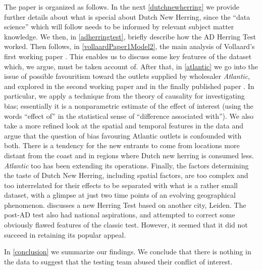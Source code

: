 \documentclass[alpha-refs]{wiley-article}
\newcommand{\fn}[1]{\textcolor{purple}{#1}}
\begin{document}
The paper is organized as follows. In the next \cref{dutchnewherring} we provide further details about what is special about Dutch New Herring, since the ``data science'' which will follow needs to be informed by relevant subject matter knowledge. We then, in \cref{adherringtest}, briefly describe how the AD Herring Test worked. Then follows, in \cref{vollaardPaper1Model2}, the main analysis of Vollaard's first working paper \citet{vollaard1}. This enables us to discuss some key features of the dataset which, we argue, must be taken account of. After that, in \cref{atlantic} we go into the issue of possible favouritism toward the outlets supplied by wholesaler \emph{Atlantic}, and explored in the second working paper \citet{vollaard2} and in the finally published paper  \citet{vollaard2021bias}. In particular, we apply a technique from the theory of causality for investigating bias; essentially it is a nonparametric estimate of the effect of interest (using the words ``effect of'' in the statistical sense of ``difference associated with''). 
We also take a more refined look at the spatial and temporal features in the data and argue that the question of bias favouring Atlantic outlets is confounded with both. 
There is a tendency for the new entrants to come from locations more distant from the coast and in regions where Dutch new herring is consumed less. \emph{Atlantic} too has been extending its operations. 
Finally, the factors determining the taste of Dutch New Herring, including spatial factors, are too complex and too interrelated for their effects to be separated with what is a rather small dataset, with a glimpse at just two time points of an evolving geographical phenomenon. 
 discusses a new Herring Test based on another city, Leiden.  The post-AD test also had national aspirations, and attempted to correct some obviously flawed features of the classic test. However, it seemed that it did not succeed in retaining its popular appeal.

In \cref{conclusion} we summarize our findings. We conclude that there is nothing in the data to suggest that the testing team abused their conflict of interest. 
\end{document}
